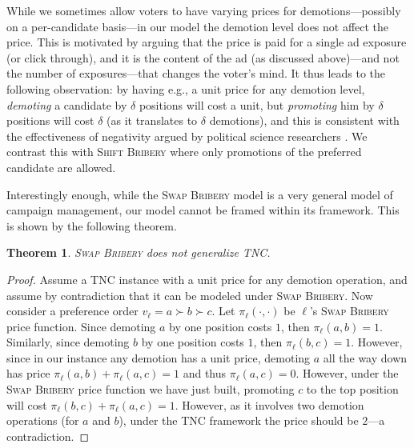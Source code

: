 \documentclass[letterpaper]{article} %
\newtheorem{theorem}{Theorem}
\newcommand{\SB}{\textsc{TNC}}
\newcommand{\swapB}{\textsc{Swap Bribery}}
\newcommand{\shiftB}{\textsc{Shift Bribery}}
\begin{document}

While we sometimes allow voters to have varying prices for demotions---possibly on a per-candidate basis---in our model the demotion level  does not affect the price. This is motivated by arguing that the price is paid for a single ad exposure (or click through), and it is the content of the ad (as discussed above)---and not the number of exposures---that changes the voter's mind. It thus leads to   the following observation: by having e.g., a unit price for any  demotion level,  \emph{demoting} a candidate by $\delta$ positions will cost a unit, but \emph{promoting} him by $\delta$ positions will cost $\delta$ (as it translates to $\delta$ demotions), and this is consistent with the effectiveness of negativity argued by political science researchers \cite{haselmayer2019negative}. We contrast this with \shiftB{} where only promotions of the preferred candidate are allowed.


Interestingly enough, while the \swapB{} model is a very general model of campaign management, our model cannot be framed within its framework. This is shown by the following theorem.
\begin{theorem}
\swapB{} does not generalize \SB.
\end{theorem}
\begin{proof}
Assume a \SB{} instance with a unit price for any demotion operation, and assume by contradiction that it can be modeled under \swapB.
 Now consider a preference order $v_\ell = a \succ b \succ c$. Let $\pi_\ell(\cdot,\cdot)$ be $\ell$'s \swapB{} price function. Since demoting $a$ by one position costs $1$, then $\pi_\ell(a,b)=1$. Similarly, since demoting $b$ by one position costs $1$, then $\pi_\ell(b,c)=1$. However, since in our instance any demotion has a unit price, demoting $a$ all the way down has price $\pi_\ell(a,b)+\pi_\ell(a,c)=1$ and thus $\pi_\ell(a,c)=0$. However, under the \swapB{} price function we have just built, promoting $c$ to the top position will cost $\pi_\ell(b,c)+\pi_\ell(a,c)=1$. However, as it involves two demotion operations (for $a$ and $b$), under the \SB{} framework the price should be $2$---a contradiction.
\end{proof}
\end{document}
